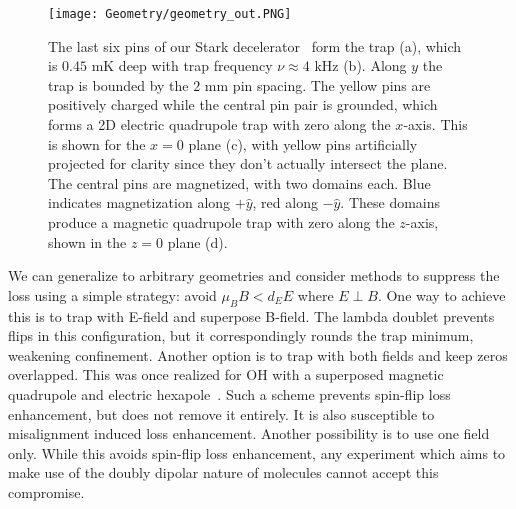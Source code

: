 \documentclass[%
 reprint,
 amsmath,amssymb,
 aps,
prl,
]{revtex4-1}
\newcommand{\epb}{{$E\!\perp\!B$}}
\begin{document}
\begin{figure}[tb]
\texttt{[image: Geometry/geometry\_out.PNG]}%
\caption{
The last six pins of our Stark decelerator~\cite{Sawyer2008} form the trap (a), which is $0.45\text{ mK}$ deep with trap frequency $\nu\approx4\text{ kHz}$ (b). Along $y$ the trap is bounded by the $2\text{ mm}$ pin spacing. The yellow pins are positively charged while the central pin pair is grounded, which forms a 2D electric quadrupole trap with zero along the $x$-axis. This is shown for the $x=0$ plane (c), with yellow pins artificially projected for clarity since they don't actually intersect the plane. The central pins are magnetized, with two domains each. Blue indicates magnetization along $+\hat{y}$, red along $-\hat{y}$. These domains produce a magnetic quadrupole trap with zero along the $z$-axis, shown in the $z=0$ plane (d). %
\label{fig:CAD}}
\end{figure}

We can generalize to arbitrary geometries and consider methods to suppress the loss using a simple strategy: avoid $\mu_BB < d_EE$ where \epb. One way to achieve this is to trap with E-field and superpose B-field. The lambda doublet prevents flips in this configuration, but it correspondingly rounds the trap minimum, weakening confinement. Another option is to trap with both fields and keep zeros overlapped. This was once realized for OH with a superposed magnetic quadrupole and electric hexapole~\cite{Sawyer2007}. Such a scheme prevents spin-flip loss enhancement, but does not remove it entirely. It is also susceptible to misalignment induced loss enhancement. Another possibility is to use one field only. While this avoids spin-flip loss enhancement, any experiment which aims to make use of the doubly dipolar nature of molecules cannot accept this compromise. 
\end{document}
